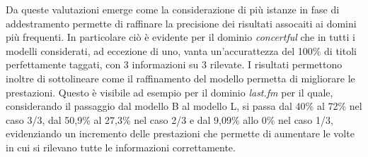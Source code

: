 \documentclass[a4paper]{report}
\begin{document}
Da queste valutazioni emerge come la considerazione di più istanze in fase di addestramento permette di raffinare la precisione dei risultati assocaiti ai domini più frequenti. In particolare ciò è evidente per il dominio \textit{concertful} che in tutti i modelli considerati, ad eccezione di uno, vanta un'accurattezza del 100\% di titoli perfettamente taggati, con 3 informazioni su 3 rilevate. I risultati permettono inoltre di sottolineare come il raffinamento del modello permetta di migliorare le prestazioni. Questo è visibile ad esempio per il dominio \textit{last.fm} per il quale, considerando il passaggio dal modello B al modello L, si passa dal 40\% al 72\% nel caso 3/3, dal 50,9\% al 27,3\% nel caso 2/3 e dal 9,09\% allo 0\% nel caso 1/3, evidenziando un incremento delle prestazioni che permette di aumentare le volte in cui si rilevano tutte le informazioni correttamente.
\end{document}
